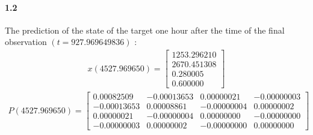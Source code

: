\documentclass[a4paper]{article}
\begin{document}
\paragraph{1.2 } The prediction of the state of the target one hour after the time of the final observation $(t=927.969649836)$ : \\
\begin{align*}
x(4527.969650) = \begin{bmatrix}
		1253.296210 \\
   		2670.451308 \\
      	0.280005 \\
      	0.600000  
	\end{bmatrix}
\end{align*}
\begin{align*}
P(4527.969650) =  \begin{bmatrix}
		    0.00082509  &  -0.00013653  &   0.00000021  &  -0.00000003 \\
   			-0.00013653  &   0.00008861  &  -0.00000004  &   0.00000002 \\
    		0.00000021  &  -0.00000004   &  0.00000000  &  -0.00000000 \\
   			-0.00000003  &   0.00000002  &  -0.00000000   &  0.00000000
	\end{bmatrix}
\end{align*} \\
\end{document}
